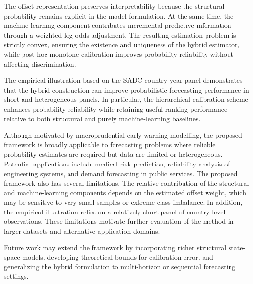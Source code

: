 \documentclass[a4paper,fleqn]{cas-dc}
\begin{document}
The offset representation preserves interpretability because the structural probability remains explicit in the model formulation. At the same time, the machine-learning component contributes incremental predictive information through a weighted log-odds adjustment. The resulting estimation problem is strictly convex, ensuring the existence and uniqueness of the hybrid estimator, while post-hoc monotone calibration improves probability reliability without affecting discrimination.

The empirical illustration based on the SADC country-year panel demonstrates that the hybrid construction can improve probabilistic forecasting performance in short and heterogeneous panels. In particular, the hierarchical calibration scheme enhances probability reliability while retaining useful ranking performance relative to both structural and purely machine-learning baselines.

Although motivated by macroprudential early-warning modelling, the proposed framework is broadly applicable to forecasting problems where reliable probability estimates are required but data are limited or heterogeneous. Potential applications include medical risk prediction, reliability analysis of engineering systems, and demand forecasting in public services.
The proposed framework also has several limitations. The relative contribution of the structural and machine-learning components depends on the estimated offset weight, which may be sensitive to very small samples or extreme class imbalance. In addition, the empirical illustration relies on a relatively short panel of country-level observations. These limitations motivate further evaluation of the method in larger datasets and alternative application domains.

Future work may extend the framework by incorporating richer structural state-space models, developing theoretical bounds for calibration error, and generalizing the hybrid formulation to multi-horizon or sequential forecasting settings.
	\printcredits
	
	\FloatBarrier
	
	
	
\end{document}
